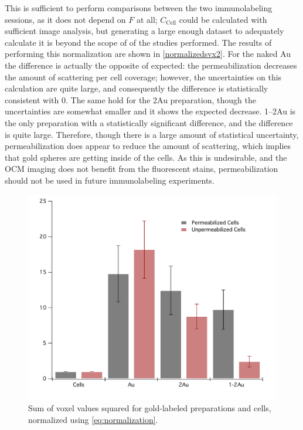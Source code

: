This is sufficient to perform comparisons between the two immunolabeling sessions, as it does not depend on $F$ at all; $C_{\mathrm{Cell}}$ could be calculated with sufficient image analysis, but generating a large enough dataset to adequately calculate it is beyond the scope of of the studies performed. The results of performing this normalization are shown in \autoref{normalizedsvx2}. For the naked Au the difference is actually the opposite of expected: the permeabilization decreases the amount of scattering per cell coverage; however, the uncertainties on this calculation are quite large, and consequently the difference is statistically consistent with 0. The same hold for the 2Au preparation, though the uncertainties are somewhat smaller and it shows the expected decrease. 1--2Au is the only preparation with a statistically significant difference, and the difference is quite large. Therefore, though there is a large amount of statistical uncertainty, permeabilization does appear to reduce the amount of scattering, which implies that gold spheres are getting inside of the cells. As this is undesirable, and the OCM imaging does not benefit from the fluorescent stains, permeabilization should not be used in future immunolabeling experiments.

\begin{figure}[htbp]
\centering
\includegraphics[keepaspectratio,width=\textwidth,height=0.75\textheight]{NormalizedSvx2.pdf}
\caption{Sum of voxel values squared for gold-labeled preparations and cells, normalized using \autoref{eq:normalization}.}
\label{normalizedsvx2}
\end{figure}




